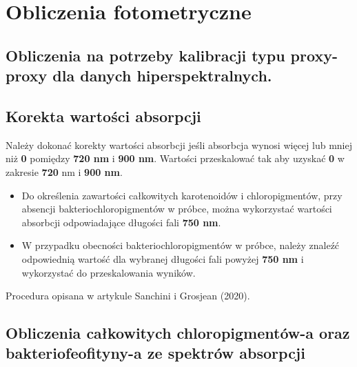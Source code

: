 \documentclass[
  letterpaper,
  DIV=11,
  numbers=noendperiod]{scrreprt}
\begin{document}
\hypertarget{obliczenia-fotometryczne}{%
\section{Obliczenia fotometryczne}\label{obliczenia-fotometryczne}}

\hypertarget{obliczenia-na-potrzeby-kalibracji-typu-proxy-proxy-dla-danych-hiperspektralnych.}{%
\subsection{Obliczenia na potrzeby kalibracji typu proxy-proxy dla
danych
hiperspektralnych.}\label{obliczenia-na-potrzeby-kalibracji-typu-proxy-proxy-dla-danych-hiperspektralnych.}}

\hypertarget{korekta-wartoux15bci-absorpcji}{%
\subsection{Korekta wartości
absorpcji}\label{korekta-wartoux15bci-absorpcji}}

Należy dokonać korekty wartości absorbcji jeśli absorbcja wynosi więcej
lub mniej niż \textbf{0} pomiędzy \textbf{720 nm} i \textbf{900 nm}.
Wartości przeskalować tak aby uzyskać \textbf{0} w zakresie \textbf{720}
nm i \textbf{900 nm}.

\begin{itemize}
\item
  Do określenia zawartości całkowitych karotenoidów i chloropigmentów,
  przy absencji bakteriochloropigmentów w próbce, można wykorzystać
  wartości absorbcji odpowiadające długości fali \textbf{750 nm}.
\item
  W przypadku obecności bakteriochloropigmentów w próbce, należy znaleźć
  odpowiednią wartość dla wybranej długości fali powyżej \textbf{750 nm}
  i wykorzystać do przeskalowania wyników.
\end{itemize}

Procedura opisana w artykule Sanchini i Grosjean (2020).

\hypertarget{obliczenia-caux142kowitych-chloropigmentuxf3w-a-oraz-bakteriofeofityny-a-ze-spektruxf3w-absorpcji}{%
\subsection{Obliczenia całkowitych chloropigmentów-a oraz
bakteriofeofityny-a ze spektrów
absorpcji}\label{obliczenia-caux142kowitych-chloropigmentuxf3w-a-oraz-bakteriofeofityny-a-ze-spektruxf3w-absorpcji}}
\end{document}
